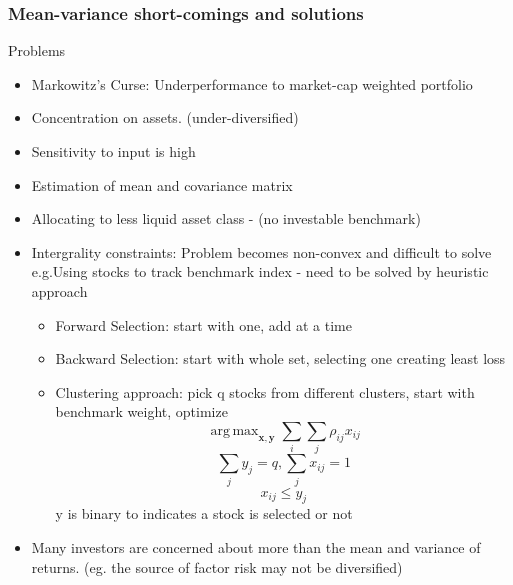 \documentclass[11pt, openany]{book}              %
\DeclareMathOperator*{\argmax}{arg\,max}  %
\begin{document}
\subsubsection{Mean-variance short-comings and solutions}

Problems
\begin{itemize}
	\item Markowitz's Curse: Underperformance to market-cap weighted portfolio 
	\item Concentration on assets. (under-diversified)
	\item Sensitivity to input is high
	\item Estimation of mean and covariance matrix
	\item  Allocating to less liquid asset class - (no investable benchmark)
	\item Intergrality constraints: Problem becomes non-convex and difficult to solve
		\subitem e.g.Using stocks to track benchmark index - need to be solved by heuristic approach
		\begin{itemize}
			\item Forward Selection: start with one, add at a time
			\item Backward Selection: start with whole set, selecting one creating least loss
			\item Clustering approach: pick q stocks from different clusters, start with benchmark weight, optimize
			$$ \argmax _{\mathbf{x,y}} \sum_i \sum_j \rho_{ij} x_{ij}$$
			$$ \sum_j y_j = q, \sum_j x_{ij} = 1$$
			$$ x_{ij} \leq y_j $$ y is binary to indicates a stock is selected or not
		\end{itemize}
	\item Many investors are concerned about more than the mean and variance of returns. (eg. the source of factor risk may not be diversified)
\end{itemize}
\end{document}
